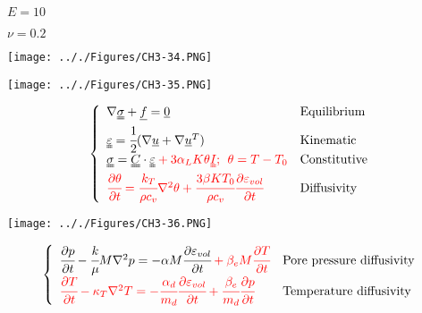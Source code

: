 \documentclass[onecolumn,11pt]{report}
\def\lthtmlcheckvsize{\ifdim\ht\sizebox<\vsize 
  \ifdim\wd\sizebox<\hsize\expandafter\hfill\fi \expandafter\vfill
  \else\expandafter\vss\fi}%
\begin{document}
{\newpage\clearpage
{}%
$ E = 10$%
\lthtmlindisplaymathZ
\lthtmlcheckvsize\clearpage}

{\newpage\clearpage
{}%
$ \nu = 0.2$%
\lthtmlindisplaymathZ
\lthtmlcheckvsize\clearpage}

{\newpage\clearpage
{}%
\texttt{[image: .././Figures/CH3-34.PNG]}%
\lthtmlpictureZ
\lthtmlcheckvsize\clearpage}

{\newpage\clearpage
{}%
\texttt{[image: .././Figures/CH3-35.PNG]}%
\lthtmlpictureZ
\lthtmlcheckvsize\clearpage}

{\newpage\clearpage
{}%
\begin{displaymath}\left\lbrace
\begin{array} {ll}
\nabla \uuline{\sigma} + \uline{f} = \uline{0} & \text{Equilibrium}\\
\uuline{\varepsilon} = \cfrac{1}{2} ( \nabla {\uline{u}} + \nabla {\uline{u}}^T ) & \text{Kinematic} \\
\uuline{\sigma} = \uuline{C} \cdot \uuline{\varepsilon} \color{red} + 3 \alpha_L K \theta \uuline{I}; \:\: \theta = T - T_0  & \text{Constitutive}\\
\color{red} \cfrac{\partial \theta}{\partial t} = \cfrac{k_T}{\rho c_v} \nabla^2 \theta + \cfrac{3 \beta K T_0}{\rho c_v} \cfrac{\partial \varepsilon_{vol}}{\partial t} & \text{Diffusivity}
\end{array}
\right.\end{displaymath}%
\lthtmldisplayZ
\lthtmlcheckvsize\clearpage}

{\newpage\clearpage
{}%
\texttt{[image: .././Figures/CH3-36.PNG]}%
\lthtmlpictureZ
\lthtmlcheckvsize\clearpage}

{\newpage\clearpage
{}%
\begin{displaymath}\left\lbrace
\begin{array} {ll}
\cfrac{\partial p}{\partial t} - \cfrac{k}{\mu} M \nabla^2 p = - \alpha M \cfrac{\partial \varepsilon_{vol}}{\partial t} \color{red} + \beta_e M  \cfrac{\partial T}{\partial t} & \text{Pore pressure diffusivity}\\
\color{red} \cfrac{\partial T}{\partial t} - \kappa_T \nabla^2 T = -\cfrac{\alpha_d}{m_d} \cfrac{\partial \varepsilon_{vol}}{\partial t} + \cfrac{\beta_e}{m_d} \cfrac{\partial p}{\partial t} & \text{Temperature diffusivity}
\end{array}
\right.\end{displaymath}%
\lthtmldisplayZ
\lthtmlcheckvsize\clearpage}
\end{document}
